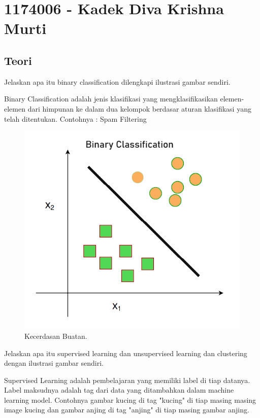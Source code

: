 \section{1174006 - Kadek Diva Krishna Murti}

\subsection{Teori}
\noindent
Jelaskan apa itu binary classification dilengkapi ilustrasi gambar sendiri.

\noindent
Binary Classification adalah jenis klasifikasi yang mengklasifikasikan elemen-elemen dari himpunan ke dalam dua kelompok berdasar aturan klasifikasi yang telah ditentukan. Contohnya : Spam Filtering

\hfill\break
\begin{figure}[H]
    \includegraphics[width=1\textwidth]{figures/1174006/chapter2/teori/1.png}
    \centering
    \caption{Kecerdasan Buatan.}
\end{figure}

\noindent
Jelaskan apa itu supervised learning dan unsupervised learning dan clustering dengan ilustrasi gambar sendiri.

\noindent
Supervised Learning adalah pembelajaran yang memiliki label di tiap datanya. Label maksudnya adalah tag dari data yang ditambahkan dalam machine learning model. Contohnya gambar kucing di tag "kucing" di tiap masing masing image kucing dan gambar anjing di tag "anjing" di tiap masing gambar anjing.

